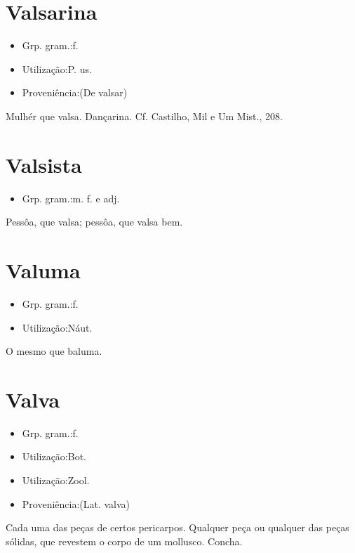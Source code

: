 \documentclass{article}
\begin{document}
\section{Valsarina}
\begin{itemize}
\item {Grp. gram.:f.}
\end{itemize}
\begin{itemize}
\item {Utilização:P. us.}
\end{itemize}
\begin{itemize}
\item {Proveniência:(De \textunderscore valsar\textunderscore )}
\end{itemize}
Mulhér que valsa.
Dançarina. Cf. Castilho, \textunderscore Mil e Um Mist.\textunderscore , 208.
\section{Valsista}
\begin{itemize}
\item {Grp. gram.:m.   f.  e  adj.}
\end{itemize}
Pessôa, que valsa; pessôa, que valsa bem.
\section{Valuma}
\begin{itemize}
\item {Grp. gram.:f.}
\end{itemize}
\begin{itemize}
\item {Utilização:Náut.}
\end{itemize}
O mesmo que \textunderscore baluma\textunderscore .
\section{Valva}
\begin{itemize}
\item {Grp. gram.:f.}
\end{itemize}
\begin{itemize}
\item {Utilização:Bot.}
\end{itemize}
\begin{itemize}
\item {Utilização:Zool.}
\end{itemize}
\begin{itemize}
\item {Proveniência:(Lat. \textunderscore valva\textunderscore )}
\end{itemize}
Cada uma das peças de certos pericarpos.
Qualquer peça ou qualquer das peças sólidas, que revestem o corpo de um mollusco.
Concha.
\end{document}

